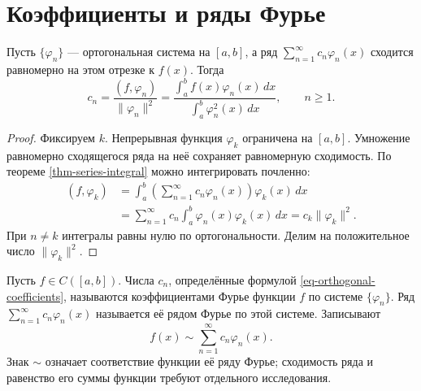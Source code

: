 \section{Коэффициенты и ряды Фурье}\label{sec-fourier-coefficients}

\begin{lemma}\label{lem-orthogonal-coefficients}

Пусть \(\{\varphi_n\}\) --- ортогональная система на \([a,b]\), а ряд \(\sum_{n=1}^\infty c_n\varphi_n(x)\) сходится равномерно на этом отрезке к \(f(x)\). Тогда
\begin{equation}
c_n=\frac{(f,\varphi_n)}{\|\varphi_n\|^2}
=\frac{\displaystyle\int_a^b f(x)\varphi_n(x)\,dx}
{\displaystyle\int_a^b\varphi_n^2(x)\,dx},
\qquad n\ge1.
\label{eq-orthogonal-coefficients}
\end{equation}

\end{lemma}

\begin{proof}

Фиксируем \(k\). Непрерывная функция \(\varphi_k\) ограничена на \([a,b]\). Умножение равномерно сходящегося ряда на неё сохраняет равномерную сходимость. По теореме \ref{thm-series-integral} можно интегрировать почленно:
\[
\begin{aligned}
(f,\varphi_k)
&=\int_a^b\left(\sum_{n=1}^\infty c_n\varphi_n(x)\right)\varphi_k(x)\,dx\\
&=\sum_{n=1}^\infty c_n\int_a^b\varphi_n(x)\varphi_k(x)\,dx
=c_k\|\varphi_k\|^2.
\end{aligned}
\]
При \(n\ne k\) интегралы равны нулю по ортогональности. Делим на положительное число \(\|\varphi_k\|^2\).

\end{proof}

\begin{definition}\label{def-orthogonal-fourier-series}

Пусть \(f\in C([a,b])\). Числа \(c_n\), определённые формулой \eqref{eq-orthogonal-coefficients}, называются коэффициентами Фурье функции \(f\) по системе \(\{\varphi_n\}\). Ряд \(\sum_{n=1}^\infty c_n\varphi_n(x)\) называется её рядом Фурье по этой системе. Записывают
\[
f(x)\sim\sum_{n=1}^\infty c_n\varphi_n(x).
\]
Знак \(\sim\) означает соответствие функции её ряду Фурье; сходимость ряда и равенство его суммы функции требуют отдельного исследования.

\end{definition}

